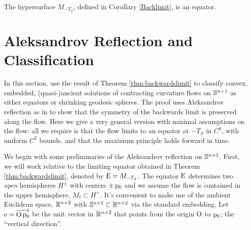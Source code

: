 \documentclass{amsart}
\begin{document}
\begin{theorem}
\label{thm:backwardslimit}
The hypersurface $M_{-T_S}$, defined in Corollary \ref{Backlimit}, is an equator.
\end{theorem}

\section{Aleksandrov Reflection and Classification}

In this section, use the result of Theorem \ref{thm:backwardslimit} to classify convex, embedded, (quasi-)ancient solutions of contracting curvature flows on \(\S^{n+1}\) as either equators or shrinking geodesic spheres. The proof uses Aleksandrov reflection as in \cite{bryanlouie,2015arXiv150802821B} to show that the symmetry of the backwards limit is preserved along the flow. Here we give a very general version with minimal assumptions on the flow: all we require is that the flow limits to an equator at $-T_S$ in \(C^0\), with uniform \(C^2\) bounds, and that the maximum principle holds forward in time.

We begin with some preliminaries of the Aleksandrov reflection on \(\S^{n+1}\). First, we will work relative to the limiting equator obtained in Theorem \ref{thm:backwardslimit}, denoted by $\equator = M_{-T_S}$. The equator \(\equator\) determines two \emph{open} hemispheres \(H^{\pm}\) with centers \(\pm \basepoint\) and we assume the flow is contained in the upper hemisphere, $M_t \subset H^+$. It's convenient to make use of the ambient Euclidean space, \(\R^{n+2}\) with \(\S^{n+1} \subset \R^{n+2}\) via the standard embedding. Let \(\vertvec = \overrightarrow{\origin\basepoint}\) be the unit vector in \(\R^{n+2}\) that points from the origin \(\origin\) to \(\basepoint\); the ``vertical direction''. 
\end{document}
